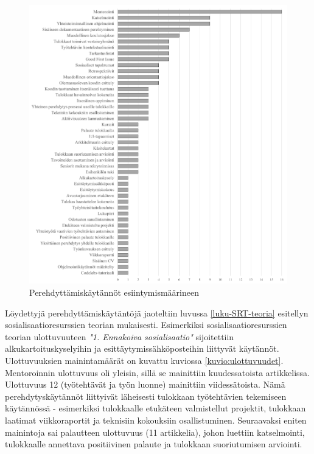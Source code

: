 \documentclass[utf8]{gradu3}
\begin{document}
\begin{figure}[h]
    \centering
    \includegraphics[width=14cm]{media/45-kaytannot.png}
    \caption{Perehdyttämiskäytännöt esiintymismäärineen}
    \label{kuvio:kaytannot}
\end{figure}

Löydettyjä perehdyttämiskäytäntöjä jaoteltiin luvussa \ref{luku-SRT-teoria} esitellyn sosialisaatioresurssien teorian mukaisesti. Esimerkiksi sosialisaatioresurssien teorian ulottuvuuteen \textit{"1. Ennakoiva sosialisaatio"} sijoitettiin alkukartoituskyselyihin ja esittäytymissähköposteihin liittyvät käytännöt. Ulottuvuuksien mainintamäärät on kuvattu kuviossa \ref{kuvio:ulottuvuudet}. Mentoroinnin ulottuvuus oli yleisin, sillä se mainittiin kuudessatoista artikkelissa. Ulottuvuus 12 (työtehtävät ja työn luonne) mainittiin viidessätoista. Nämä perehdytyskäytännöt liittyivät läheisesti tulokkaan työtehtävien tekemiseen käytännössä - esimerkiksi tulokkaalle etukäteen valmistellut projektit, tulokkaan laatimat viikkoraportit ja teknisiin kokouksiin osallistuminen. Seuraavaksi eniten mainintoja sai palautteen ulottuvuus (11 artikkelia), johon luettiin katselmointi, tulokkaalle annettava positiivinen palaute ja tulokkaan suoriutumisen arviointi.
\end{document}
